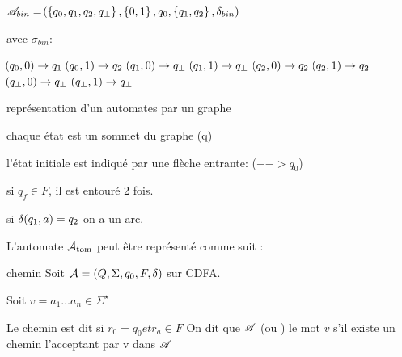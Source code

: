     \begin{example}{}{}
        $\mathscr{A}_{bin} = \!\left(\left\{q_0, q_1, q_2, q_\bot\right\}, \left\{0, 1\right\}, q_0, \left\{q_1, q_2\right\}, \delta_{bin}\right)$
        
        avec $\sigma_{bin} :$
        \begin{enumerate}
            \itt $\!\left(q_0, 0\right) \to q_1$
            \itt $\!\left(q_0, 1\right) \to q_2$
            \itt $\!\left(q_1, 0\right) \to q_\bot$
            \itt $\!\left(q_1, 1\right) \to q_\bot$
            \itt $\!\left(q_2, 0\right) \to q_2$
            \itt $\!\left(q_2, 1\right) \to q_2$
            \itt $\!\left(q_\bot, 0\right) \to q_\bot$
            \itt $\!\left(q_\bot, 1\right) \to q_\bot$
        \end{enumerate}
    \end{example}
    \begin{notation}
        représentation d'un automates par un graphe
        
        \begin{enumerate}
            \itt chaque état est un sommet du graphe (q)
            
            \itt l'état initiale est indiqué par une flèche entrante: ($--> q_0$)
            
            \itt si $q_f \in F$, il est entouré 2 fois.
            
            \itt si $\delta \!\left(q_1, a\right) = q_2$ on a un arc.
            
            
        \end{enumerate}
        
        
    \end{notation}
     
    \begin{example}{}{}
        L'automate $\mathop{\mathcal{A}_\text{tom}}\nolimits$ peut être représenté comme suit :
        
        
    
        
    \end{example}
    \begin{definition}{chemin}{}
        Soit $\mathcal{A} = (Q,\Sigma, q_0, F, \delta)$ sur CDFA.
        
        
        Soit $v = a_1 \dots a_n  \in \Sigma^\star$ 
        
        Le chemin est dit  si $r_0 = q_0 et r_a \in F$
        On dit que $\mathscr{A}$  (ou ) le mot $v$ s'il existe un chemin l'acceptant par v dans $\mathscr{A}$
        
    \end{definition}
    
